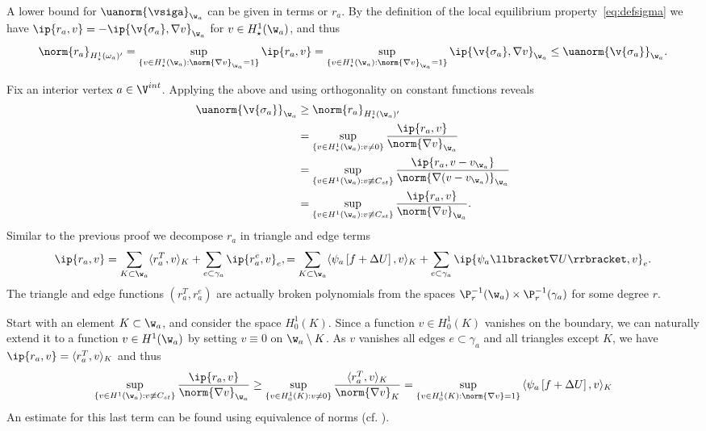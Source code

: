 
  A lower bound for $\uanorm{\vsiga}_{\w_a}$ can be given in terms or $r_a$.
  By the definition of the local equilibrium property~\eqref{eq:defsigma} we have $\ip{r_a, v} = - \ip{\v{\sigma_a}, \nabla v}_{\w_a}$ for $v \in H_\star^1(\w_a)$,
  and thus
  \[
    \norm{r_a}_{H_\star^1(\omega_a)'} = \sup_{\{v \in H_\star^1(\w_a) : \norm{\nabla v}_{\w_a} = 1\}} {\ip{r_a, v}} = \sup_{\{v \in H_\star^1(\w_a) : \norm{\nabla v}_{\w_a}=1\}} {\ip{\v{\sigma_a}, \nabla v}_{\w_a}} \leq \uanorm{\v{\sigma_a}}_{\w_a}.
  \]

  Fix an interior vertex  $a \in \V^{int}$. Applying the above and using orthogonality on constant functions reveals  
  \begin{align*}
    \uanorm{\v{\sigma_a}}_{\w_a} &\geq \norm{r_a}_{H^1_\star(\w_a)'} \\
    &= \sup_{\{v \in H^1_\star(\w_a) : v \ne 0\}} { \ip{r_a, v} \over \norm{\nabla v}_{\w_a}} \\
    &= \sup_{\{v \in H^1(\w_a) : v \not \equiv C_{st}\}} { \ip{r_a, v - v_{\w_a}} \over \norm{\nabla (v - v_{\w_a})}_{\w_a}} \\
    &= \sup_{\{v \in H^1(\w_a) : v \not \equiv C_{st}\}} { \ip{r_a, v} \over \norm{\nabla v}_{\w_a}}.
  \end{align*}
  Similar to the previous proof we decompose $r_a$ in triangle and edge terms
  \[
    \ip{r_a,v} = \sum_{K\subset \w_a} \langle{r^T_a, v}\rangle_K + \sum_{e \subset \gamma_a} \ip{r^e_a, v}_e,
    = \sum_{K\subset \w_a} \langle{\psi_a \left [f+\Delta U \right], v}\rangle_K + \sum_{e \subset \gamma_a} \ip{\psi_a \llbracket \nabla U \rrbracket, v}_e.
  \]
  The triangle and edge functions $(r^T_a, r^e_a)$ are actually broken polynomials from the spaces $\P_r^{-1}(\w_a)\times \P_r^{-1}(\gamma_a)$ for some degree $r$.

  Start with an element $K \subset \w_a$, and consider the space $H_0^1(K)$. Since a function $v \in H_0^1(K)$ vanishes on the boundary, 
  we can naturally extend it to a function $v \in H^1(\w_a)$ by setting $v \equiv 0$ on $\w_a \setminus K$. As $v$
  vanishes all edges $e \subset \gamma_a$ and all triangles except $K$, we have $\ip{r_a, v} = \langle{r_a^T, v}\rangle_K$ and thus
  \[
    \sup_{\{v \in H^1(\w_a) : v \not \equiv C_{st}\}} { \ip{r_a, v} \over \norm{\nabla v}_{\w_a}} 
    \geq \sup_{\{v \in H_0^1(K) : v \ne 0\}} { \langle{r^T_a, v}\rangle_K \over \norm{\nabla v}_{K}}
    = \sup_{\{v \in H_0^1(K) :  \norm{\nabla v}=1\}} { \langle\psi_a\left[ f + \Delta U\right],v\rangle_K }
  \]
  An estimate for this last term can be found using equivalence of norms (cf. \cite[Ex~9.x.5]{brenner}).
  

